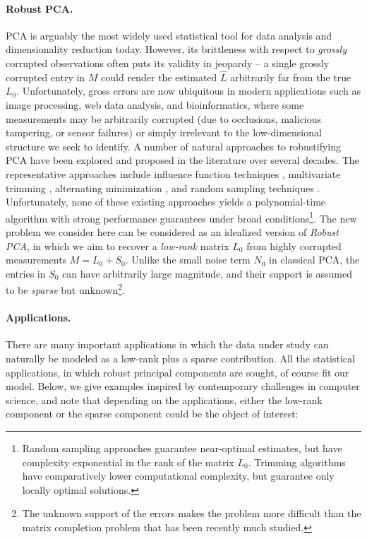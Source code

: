 \paragraph{Robust PCA.} PCA is arguably the most widely used statistical tool for data analysis and dimensionality reduction today. However, its brittleness with respect to {\em grossly} corrupted observations often puts its validity in jeopardy -- a single grossly corrupted entry in $M$ could render the estimated $\hat{L}$
arbitrarily far from the true $L_0$. Unfortunately, gross errors are now ubiquitous in modern applications such as image processing, web data analysis, and bioinformatics, where some measurements may be arbitrarily corrupted (due to occlusions, malicious tampering, or sensor failures) or simply irrelevant to the low-dimensional structure we seek to identify.  A number of natural approaches to robustifying PCA have been explored and proposed in the literature over several decades. The representative approaches include influence function techniques \cite{Huber,DeLaTorre2003-IJCV}, multivariate trimming \cite{Gnanadesikan1972-Biometrics}, alternating minimization \cite{Ke2005-CVPR}, and random sampling techniques \cite{Fischler1981-ACM}. Unfortunately, none of these existing approaches yields a polynomial-time algorithm with strong performance guarantees under broad conditions\footnote{Random sampling approaches guarantee near-optimal estimates, but have complexity exponential in the rank of the matrix $L_0$. Trimming algorithms have comparatively lower computational complexity, but guarantee only locally optimal solutions.}. The new problem we consider here can be considered as an idealized version of {\em Robust PCA}, in which we aim to recover a
{\em low-rank} matrix $L_0$ from highly corrupted measurements $M = L_0 + S_0$. Unlike the small noise term $N_0$ in classical PCA, the entries in $S_0$ can have arbitrarily large magnitude, and their support is assumed to be {\em sparse} but unknown\footnote{The unknown support of the errors makes the problem more difficult than the matrix completion problem that has been recently much studied.}.

\paragraph{Applications.} There are many important applications in which the data under study can naturally be modeled as a low-rank plus a sparse contribution. All the statistical applications, in which robust principal components are sought, of course fit our model. Below, we give examples inspired by contemporary challenges in computer science, and note that depending on the applications, either the low-rank component or the sparse component could be the object of interest:

